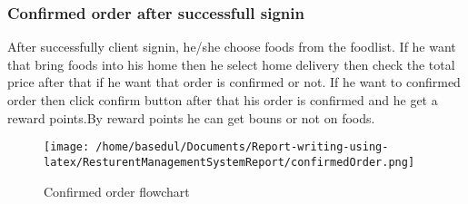 \documentclass[12pt,a4paper]{article}
\newcommand\tab[1][.7cm]{\hspace*{#1}}
\begin{document}
	\subsubsection{Confirmed order after successfull signin}
		\tab After successfully client signin, he/she choose foods from the foodlist. If he want that bring foods into his home then he select home delivery then check the total price after that if he want that order is confirmed or not. If he want to confirmed order then click confirm button after that his order is confirmed and he get a reward points.By reward points he can get bouns or not on foods.
		\begin{figure}[H]
		\centering
		\texttt{[image: /home/basedul/Documents/Report-writing-using-latex/ResturentManagementSystemReport/confirmedOrder.png]}
		\caption{\hspace{0.35em}Confirmed order flowchart}
		\label{fig:confirmedOrder} 
		\end{figure}
		
\end{document}
